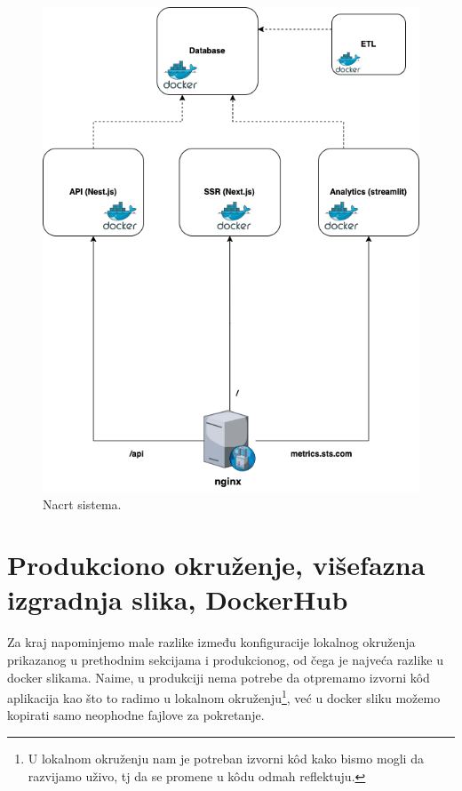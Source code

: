 \documentclass[12pt,oneside]{memoir}
\begin{document}
\begin{figure}[h, width=0.5]
  \centering
  \includegraphics[width=1\textwidth]{docs/images/ch_6/dockernadnginxfinal.png} 
  \caption{Nacrt sistema.}
  \label{fig:dockerandnginxfinal}
\end{figure}


\newpage
\section{Produkciono okruženje, višefazna izgradnja slika, DockerHub}

Za kraj napominjemo male razlike između konfiguracije lokalnog okruženja prikazanog u prethodnim sekcijama i produkcionog, od čega je najveća razlike u docker slikama. Naime, u produkciji nema potrebe da otpremamo izvorni k\^{o}d aplikacija kao što to radimo u lokalnom okruženju\footnote{U lokalnom okruženju nam je potreban izvorni k\^{o}d kako bismo mogli da razvijamo uživo, tj da se promene u k\^{o}du odmah reflektuju.}, već u docker sliku možemo kopirati samo neophodne fajlove za pokretanje.
\end{document}
